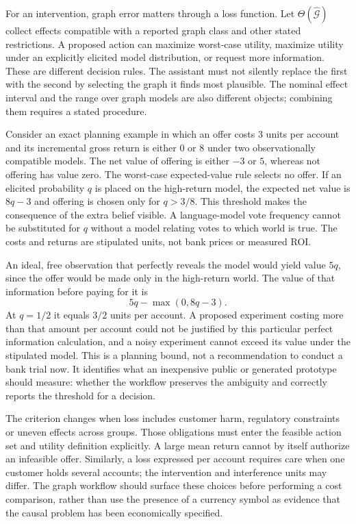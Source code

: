 For an intervention, graph error matters through a loss function. Let
$\Theta(\widehat{\mathcal G})$ collect effects compatible with a reported graph
class and other stated restrictions. A proposed action can maximize worst-case
utility, maximize utility under an explicitly elicited model distribution, or
request more information. These are different decision rules. The assistant
must not silently replace the first with the second by selecting the graph it
finds most plausible. The nominal effect interval and the range over graph
models are also different objects; combining them requires a stated procedure.

Consider an exact planning example in which an offer costs 3 units per account
and its incremental gross return is either 0 or 8 under two observationally
compatible models. The net value of offering is either $-3$ or $5$, whereas
not offering has value zero. The worst-case expected-value rule selects no
offer. If an elicited probability $q$ is placed on the high-return model, the
expected net value is $8q-3$ and offering is chosen only for $q>3/8$. This
threshold makes the consequence of the extra belief visible. A language-model
vote frequency cannot be substituted for $q$ without a model relating votes to
which world is true. The costs and returns are stipulated units, not bank
prices or measured ROI.

An ideal, free observation that perfectly reveals the model would yield value
$5q$, since the offer would be made only in the high-return world. The value of
that information before paying for it is
\[
 5q-\max(0,8q-3).
\]
At $q=1/2$ it equals $3/2$ units per account. A proposed experiment costing more
than that amount per account could not be justified by this particular perfect
information calculation, and a noisy experiment cannot exceed its value under
the stipulated model. This is a planning bound, not a recommendation to conduct
a bank trial now. It identifies what an inexpensive public or generated
prototype should measure: whether the workflow preserves the ambiguity and
correctly reports the threshold for a decision.

The criterion changes when loss includes customer harm, regulatory constraints
or uneven effects across groups. Those obligations must enter the feasible
action set and utility definition explicitly. A large mean return cannot by
itself authorize an infeasible offer. Similarly, a loss expressed per account
requires care when one customer holds several accounts; the intervention and
interference units may differ. The graph workflow should surface these choices
before performing a cost comparison, rather than use the presence of a currency
symbol as evidence that the causal problem has been economically specified.

